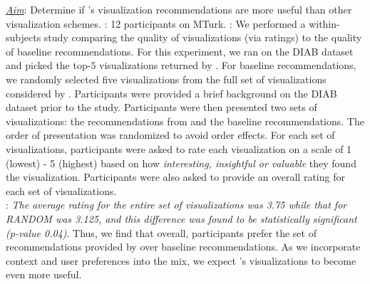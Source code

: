 
% 

{\it \underline{Aim}}: Determine if \SeeDB's visualization 
recommendations 
are more useful than other visualization schemes.
: 12 participants on MTurk.
: We performed a within-subjects study comparing the quality of \SeeDB visualizations (via ratings) to the quality of baseline recommendations.
For this experiment, we ran \SeeDB on the DIAB dataset and picked the top-$5$ visualizations returned by \SeeDB.
For baseline recommendations, we randomly selected five visualizations from
the full set of visualizations considered by \SeeDB.
Participants were provided a brief background on the DIAB dataset prior to the study.
Participants were then presented two sets of visualizations: the recommendations from \SeeDB and the baseline recommendations. 
The order of presentation was randomized to avoid order effects.
For each set of visualizations, participants were asked to rate each visualization on a scale of 1 (lowest) - 5 (highest) based on how {\it interesting, insightful or valuable} they found the visualization.
Participants were also asked to provide an overall rating for each set of visualizations.\\
: 
{\em The average rating for the entire set of \SeeDB visualizations was 3.75 while that for RANDOM was 3.125, and this difference was found to be statistically significant (p-value 0.04)}. 
Thus, we find that overall, participants prefer the set of recommendations provided by \SeeDB over baseline recommendations. 
As we incorporate context and user preferences
into the mix, we expect \SeeDB's visualizations
to become even more useful.

